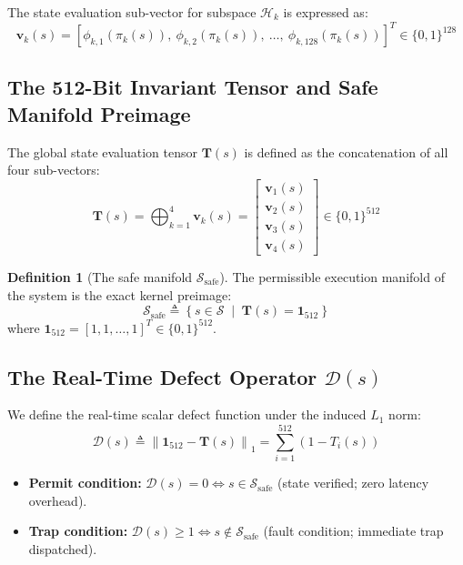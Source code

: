 \documentclass{portalciencia}
\theoremstyle{plain}
\theoremstyle{definition}
\newtheorem{definition}{Definition}
\begin{document}
The state evaluation sub-vector for subspace $\mathcal{H}_{k}$ is expressed as:
\begin{equation}
\label{eq:subvector}
\mathbf{v}_{k}(s) = \left[ \phi_{k,1}(\pi_{k}(s)),\ \phi_{k,2}(\pi_{k}(s)),\ \dots,\ \phi_{k,128}(\pi_{k}(s)) \right]^{T} \in \{0, 1\}^{128}
\end{equation}

\subsection{The 512-Bit Invariant Tensor and Safe Manifold Preimage}

The global state evaluation tensor $\mathbf{T}(s)$ is defined as the concatenation of all four sub-vectors:
\begin{equation}
\label{eq:tensor}
\mathbf{T}(s) = \bigoplus_{k=1}^{4} \mathbf{v}_{k}(s) = \begin{bmatrix} \mathbf{v}_{1}(s) \\ \mathbf{v}_{2}(s) \\ \mathbf{v}_{3}(s) \\ \mathbf{v}_{4}(s) \end{bmatrix} \in \{0, 1\}^{512}
\end{equation}

\begin{definition}[The safe manifold $\mathcal{S}_{\mathrm{safe}}$]
The permissible execution manifold of the system is the exact kernel preimage:
\begin{equation}
\label{eq:safemanifold}
\mathcal{S}_{\mathrm{safe}} \triangleq \left\{ s \in \mathcal{S} \;\middle|\; \mathbf{T}(s) = \mathbf{1}_{512} \right\}
\end{equation}
where $\mathbf{1}_{512} = [1, 1, \dots, 1]^{T} \in \{0, 1\}^{512}$.
\end{definition}

\subsection{The Real-Time Defect Operator $\mathcal{D}(s)$}

We define the real-time scalar defect function under the induced $L_1$ norm:
\begin{equation}
\label{eq:defect}
\mathcal{D}(s) \triangleq \left\| \mathbf{1}_{512} - \mathbf{T}(s) \right\|_{1} = \sum_{i=1}^{512} \left( 1 - T_{i}(s) \right)
\end{equation}
\begin{itemize}
  \item \textbf{Permit condition:} $\mathcal{D}(s) = 0 \iff s \in \mathcal{S}_{\mathrm{safe}}$ (state verified; zero latency overhead).
  \item \textbf{Trap condition:} $\mathcal{D}(s) \ge 1 \iff s \notin \mathcal{S}_{\mathrm{safe}}$ (fault condition; immediate trap dispatched).
\end{itemize}
\end{document}
